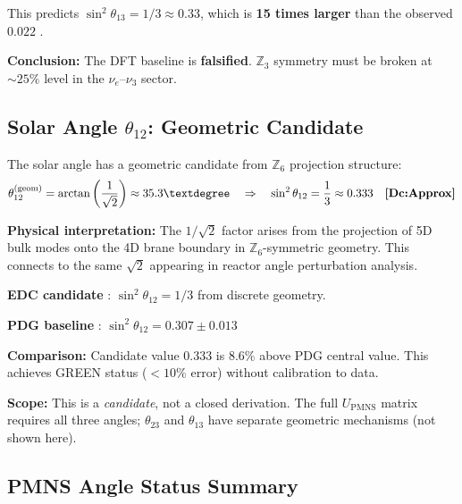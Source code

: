 This predicts $\sin^2\theta_{13} = 1/3 \approx 0.33$, which is \textbf{15 times
larger} than the observed $0.022$ \tagBL{}.

\textbf{Conclusion:} The DFT baseline is \textbf{falsified}. $\mathbb{Z}_3$
symmetry must be broken at $\sim 25\%$ level in the $\nu_e$--$\nu_3$ sector.

\subsection{Solar Angle $\theta_{12}$: Geometric Candidate}

The solar angle has a geometric candidate from $\mathbb{Z}_6$ projection structure:
\begin{equation}
    \theta_{12}^{\text{(geom)}} = \arctan\left(\frac{1}{\sqrt{2}}\right) \approx 35.3°
    \quad\Rightarrow\quad
    \sin^2\theta_{12} = \frac{1}{3} \approx 0.333
    \quad \tagDcApprox{}
    \label{eq:theta12_geometric}
\end{equation}

\textbf{Physical interpretation:} The $1/\sqrt{2}$ factor arises from the
projection of 5D bulk modes onto the 4D brane boundary in $\mathbb{Z}_6$-symmetric
geometry. This connects to the same $\sqrt{2}$ appearing in reactor angle
perturbation analysis.

\begin{tcolorbox}[colback=yellow!5!white, colframe=yellow!50!black,
    title=\textbf{Dictionary: EDC $\theta_{12}$ Candidate}]
\textbf{EDC candidate} \tagDcApprox{}: $\sin^2\theta_{12} = 1/3$ from discrete geometry.

\textbf{PDG baseline} \tagBL{}: $\sin^2\theta_{12} = 0.307 \pm 0.013$

\textbf{Comparison:} Candidate value $0.333$ is 8.6\% above PDG central value.
This achieves GREEN status ($<10\%$ error) without calibration to data.

\textbf{Scope:} This is a \emph{candidate}, not a closed derivation. The
full $U_{\text{PMNS}}$ matrix requires all three angles; $\theta_{23}$ and
$\theta_{13}$ have separate geometric mechanisms (not shown here).
\end{tcolorbox}

\subsection{PMNS Angle Status Summary}

